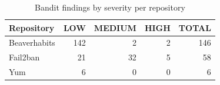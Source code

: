 \begin{table}[htbp]
\centering
\begin{tabular}{lrrrr}
\hline
Repository & LOW & MEDIUM & HIGH & TOTAL \\
\hline
Beaverhabits & 142 & 2 & 2 & 146 \\
Fail2ban & 21 & 32 & 5 & 58 \\
Yum & 6 & 0 & 0 & 6 \\
\hline
\end{tabular}
\caption{Bandit findings by severity per repository}
\label{tab:bandit_severity}
\end{table}

